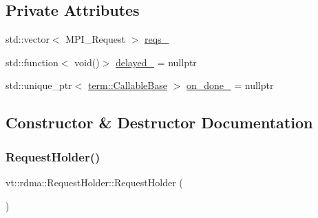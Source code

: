 \subsection*{Private Attributes}
\begin{DoxyCompactItemize}
\item 
std\+::vector$<$ M\+P\+I\+\_\+\+Request $>$ \hyperlink{structvt_1_1rdma_1_1_request_holder_ab2c38a29749f7704a49786851d947571}{reqs\+\_\+}
\item 
std\+::function$<$ void()$>$ \hyperlink{structvt_1_1rdma_1_1_request_holder_a7114ca667688685b7fcb627de3b605c0}{delayed\+\_\+} = nullptr
\item 
std\+::unique\+\_\+ptr$<$ \hyperlink{structvt_1_1term_1_1_callable_base}{term\+::\+Callable\+Base} $>$ \hyperlink{structvt_1_1rdma_1_1_request_holder_ac10cdebd8a619357fe95b1abaea3bc6d}{on\+\_\+done\+\_\+} = nullptr
\end{DoxyCompactItemize}


\subsection{Constructor \& Destructor Documentation}
\mbox{\label{structvt_1_1rdma_1_1_request_holder_a3c892c8221207bfc7039770d4fd03dab}} 
\subsubsection{\texorpdfstring{Request\+Holder()}{RequestHolder()}\hspace{0.1cm}{\footnotesize\ttfamily [1/3]}}
{\footnotesize\ttfamily vt\+::rdma\+::\+Request\+Holder\+::\+Request\+Holder (\begin{DoxyParamCaption}{ }\end{DoxyParamCaption})\hspace{0.3cm}{\ttfamily [default]}}

\mbox{\label{structvt_1_1rdma_1_1_request_holder_a23ee7c46fc8ebdd804d395eedd0c9cd6}} 
